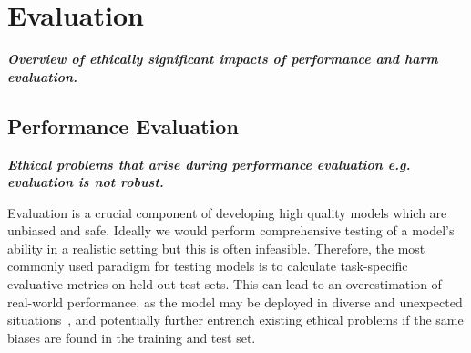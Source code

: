 \section{Evaluation}\label{sec:eval}

\noindent\textbf{\textit{Overview of ethically significant impacts of performance and harm evaluation.}}

\subsection{Performance Evaluation}\noindent\textbf{\textit{Ethical problems that arise during performance evaluation e.g. evaluation is not robust.}}
\newline 


\noindent Evaluation is a crucial component of developing high quality models which are unbiased and safe. Ideally we would perform comprehensive testing of a model's ability in a realistic setting but this is often infeasible. Therefore, the most commonly used paradigm for testing models is to calculate task-specific evaluative metrics on held-out test sets. This can lead to an overestimation of real-world performance, as the model may be deployed in diverse and unexpected situations~\citep{ribeiro_beyond_2020}, and potentially further entrench existing ethical problems if the same biases are found in the training and test set. 

